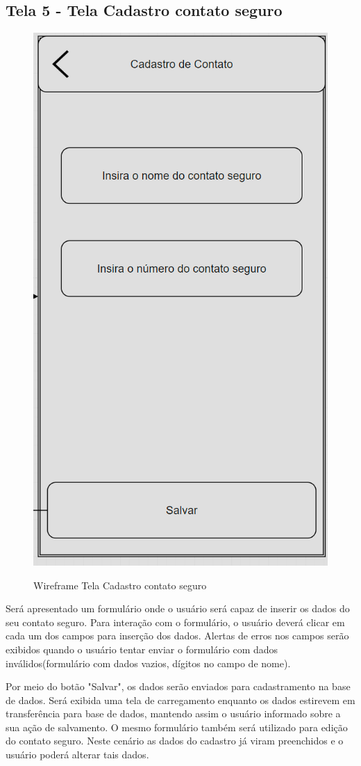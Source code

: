 \subsection{Tela 5 - Tela Cadastro contato seguro}
\begin{figure}[H]
  \begin{center}
  \includegraphics[width=0.2\linewidth]{images/wire-tela-cadsatro-contato-seguro.png}\\
  \end{center}
  \caption[Wireframe Tela Cadastro contato seguro]{Wireframe Tela Cadastro contato seguro}
  \label{fig:wireframe-tela-cadastro-contato-seguro}
\end{figure}
Será apresentado um formulário onde o usuário será capaz de inserir os dados do seu contato seguro. Para interação com o formulário, o usuário deverá clicar em cada um dos campos para inserção dos dados. Alertas de erros nos campos serão exibidos quando o usuário tentar enviar o formulário com dados inválidos(formulário com dados vazios, dígitos no campo de nome). 

Por meio do botão "Salvar", os dados serão enviados para cadastramento na base de dados. Será exibida uma tela de carregamento enquanto os dados estirevem em transferência para base de dados, mantendo assim o usuário informado sobre a sua ação de salvamento. O mesmo formulário também será utilizado para edição do contato seguro. Neste cenário as dados do cadastro já viram preenchidos e o usuário poderá alterar tais dados.

